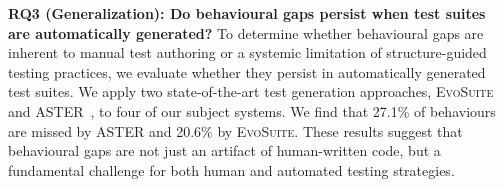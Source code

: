 
\textbf{RQ3 (Generalization): Do behavioural gaps persist when test suites are automatically generated?}
To determine whether behavioural gaps are inherent to manual test authoring or a systemic limitation of structure-guided testing practices, we evaluate whether they persist in automatically generated test suites. We apply two state-of-the-art test generation approaches, \textsc{EvoSuite}~\cite{10.1145/2025113.2025179} and \textsc{ASTER}~\cite{Pan2024ASTERNA}, to four of our subject systems. We find that 27.1\% of behaviours are missed by \textsc{ASTER} and 20.6\% by \textsc{EvoSuite}. These results suggest that behavioural gaps are not just an artifact of human-written code, but a fundamental challenge for both human and automated testing strategies.


